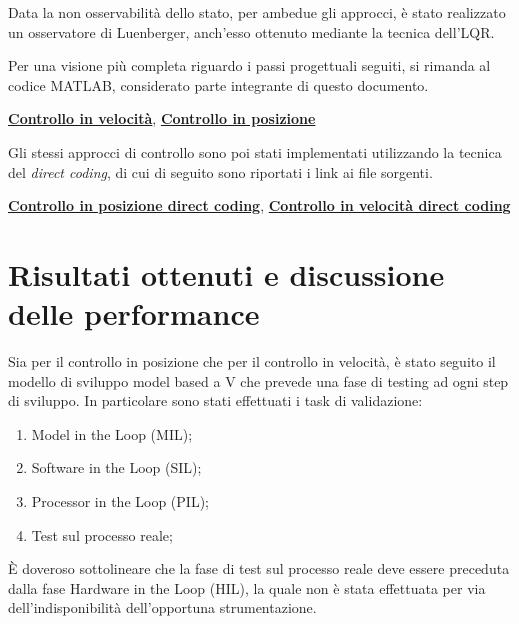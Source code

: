 \documentclass[11pt,a4paper,oneside]{extarticle}
\begin{document}
Data la non osservabilità dello stato, per ambedue gli approcci, è stato realizzato un osservatore di Luenberger, anch'esso ottenuto mediante la tecnica dell'LQR.\bigskip

Per una visione più completa riguardo i passi progettuali seguiti, si rimanda al codice MATLAB, considerato parte integrante di questo documento. \bigskip

\begin{center}
	\href{https://github.com/favallone20/DigitalControlSystemDesignProject/blob/master/Speed_Feedback_MATLAB_Simulink/Speed_State_Feedback.mlx}{\textbf{Controllo in velocità}}, \quad
	\href{https://github.com/favallone20/DigitalControlSystemDesignProject/blob/master/Position_State_Feedback_MATLAB_Simulink/Position_State_Feedback.mlx}{\textbf{Controllo in posizione}} \bigskip
\end{center}
Gli stessi approcci di controllo sono poi stati implementati utilizzando la tecnica del \textit{direct coding}, di cui di seguito sono riportati i link ai file sorgenti.

\begin{center}
	\href{https://github.com/favallone20/DigitalControlSystemDesignProject/tree/master/Position_State_Feedback_Direct_Coding}{\textbf{Controllo in posizione direct coding}}, \quad
	\href{https://github.com/favallone20/DigitalControlSystemDesignProject/tree/master/Speed_State_Feedback_Direct_Coding}{\textbf{Controllo in velocità direct coding}}
\end{center}

\section{Risultati ottenuti e discussione delle performance}
Sia per il controllo in posizione che per il controllo in velocità, è stato seguito il modello di sviluppo model based a V che prevede una fase di testing ad ogni step di sviluppo. In particolare sono stati effettuati i task di validazione:

\begin{enumerate}
	\item Model in the Loop (MIL);
	\item Software in the Loop (SIL);
	\item Processor in the Loop (PIL);
	\item Test sul processo reale;
\end{enumerate}
È doveroso sottolineare che la fase di test sul processo reale deve essere preceduta dalla fase Hardware in the Loop (HIL), la quale non è stata effettuata per via dell'indisponibilità dell'opportuna strumentazione.
\end{document}
